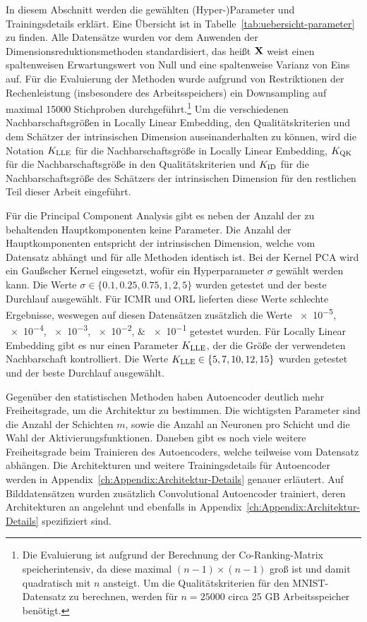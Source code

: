 In diesem Abschnitt werden die gewählten (Hyper-)Parameter und Trainingsdetails erklärt. Eine
Übersicht ist in Tabelle~\ref{tab:uebersicht-parameter} zu finden. Alle Datensätze wurden vor dem
Anwenden der Dimensionsreduktionsmethoden standardisiert, das heißt $\mathbf{X}$ weist einen
spaltenweisen Erwartungswert von Null und eine spaltenweise Varianz von Eins auf. Für die
Evaluierung der Methoden wurde aufgrund von Restriktionen der Rechenleistung (insbesondere des
Arbeitsspeichers) ein Downsampling auf maximal \num{15000} Stichproben durchgeführt.\footnote{Die
	Evaluierung ist aufgrund der Berechnung der Co-Ranking-Matrix speicherintensiv, da diese maximal
	$(n-1) \times (n-1)$ groß ist und damit quadratisch mit $n$ ansteigt. Um die Qualitätskriterien für
	den MNIST-Datensatz zu berechnen, werden für $n=\num{25000}$ circa 25 GB Arbeitsspeicher benötigt.}
Um die verschiedenen Nachbarschaftsgrößen in Locally Linear Embedding, den Qualitätskriterien und
dem Schätzer der intrinsischen Dimension auseinanderhalten zu können, wird die Notation $K_{\text{LLE}}$ für
die Nachbarschaftsgröße in Locally Linear Embedding, $K_{\text{QK}}$ für die Nachbarschaftsgröße in den
Qualitätskriterien und $K_{\text{ID}}$ für die Nachbarschaftsgröße des Schätzers der intrinsischen Dimension
für den restlichen Teil dieser Arbeit eingeführt.

Für die Principal Component Analysis gibt es neben der Anzahl der zu behaltenden Hauptkomponenten
keine Parameter. Die Anzahl der Hauptkomponenten entspricht der intrinsischen Dimension, welche vom
Datensatz abhängt und für alle Methoden identisch ist. Bei der Kernel PCA wird ein Gaußscher Kernel
eingesetzt, wofür ein Hyperparameter $\sigma$ gewählt werden kann. Die Werte $\sigma \in \{ 0.1,
	0.25, 0.75, 1, 2, 5\}$ wurden getestet und der beste Durchlauf ausgewählt. Für ICMR und ORL
lieferten diese Werte schlechte Ergebnisse, weswegen auf diesen Datensätzen zusätzlich die Werte
\numlist{e-5;e-4;e-3;e-2;e-1} getestet wurden. Für Locally Linear Embedding gibt es nur einen
Parameter $K_{\text{LLE}}$, der die Größe der verwendeten Nachbarschaft kontrolliert. Die Werte $K_{\text{LLE}} \in
	\{ 5, 7, 10, 12, 15\}$ wurden getestet und der beste Durchlauf ausgewählt.

Gegenüber den statistischen Methoden haben Autoencoder deutlich mehr Freiheitsgrade, um die
Architektur zu bestimmen. Die wichtigsten Parameter sind die Anzahl der Schichten $m$, sowie die
Anzahl an Neuronen pro Schicht und die Wahl der Aktivierungsfunktionen. Daneben gibt es noch viele
weitere Freiheitsgrade beim Trainieren des Autoencoders, welche teilweise vom Datensatz abhängen.
Die Architekturen und weitere Trainingsdetails für Autoencoder werden in
Appendix~\ref{ch:Appendix:Architektur-Details} genauer erläutert. Auf Bilddatensätzen wurden
zusätzlich Convolutional Autoencoder trainiert, deren Architekturen an \textcite[14]{Ghosh.2019}
angelehnt und ebenfalls in Appendix~\ref{ch:Appendix:Architektur-Details} spezifiziert sind.

